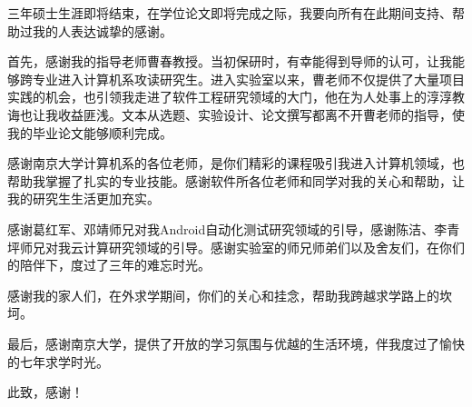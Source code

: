 \documentclass[winfonts,master,twoside]{njuthesis}
\begin{document}
\begin{acknowledgement}

三年硕士生涯即将结束，在学位论文即将完成之际，我要向所有在此期间支持、帮助过我的人表达诚挚的感谢。

首先，感谢我的指导老师曹春教授。当初保研时，有幸能得到导师的认可，让我能够跨专业进入计算机系攻读研究生。进入实验室以来，曹老师不仅提供了大量项目实践的机会，也引领我走进了软件工程研究领域的大门，他在为人处事上的淳淳教诲也让我收益匪浅。文本从选题、实验设计、论文撰写都离不开曹老师的指导，使我的毕业论文能够顺利完成。

感谢南京大学计算机系的各位老师，是你们精彩的课程吸引我进入计算机领域，也帮助我掌握了扎实的专业技能。感谢软件所各位老师和同学对我的关心和帮助，让我的研究生生活更加充实。

感谢葛红军、邓靖师兄对我Android自动化测试研究领域的引导，感谢陈洁、李青坪师兄对我云计算研究领域的引导。感谢实验室的师兄师弟们以及舍友们，在你们的陪伴下，度过了三年的难忘时光。

感谢我的家人们，在外求学期间，你们的关心和挂念，帮助我跨越求学路上的坎坷。

最后，感谢南京大学，提供了开放的学习氛围与优越的生活环境，伴我度过了愉快的七年求学时光。

此致，感谢！

\end{acknowledgement}










\backmatter
\end{document}
